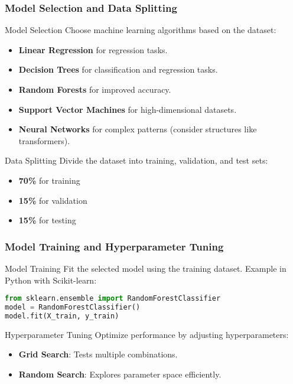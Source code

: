 \documentclass[aspectratio=169]{beamer}
\begin{document}
\begin{frame}[fragile]
    \frametitle{Model Selection and Data Splitting}
    \begin{block}{Model Selection}
        Choose machine learning algorithms based on the dataset:
        \begin{itemize}
            \item \textbf{Linear Regression} for regression tasks.
            \item \textbf{Decision Trees} for classification and regression tasks.
            \item \textbf{Random Forests} for improved accuracy.
            \item \textbf{Support Vector Machines} for high-dimensional datasets.
            \item \textbf{Neural Networks} for complex patterns (consider structures like transformers).
        \end{itemize}
    \end{block}
    
    \begin{block}{Data Splitting}
        Divide the dataset into training, validation, and test sets:
        \begin{itemize}
            \item \textbf{70\%} for training
            \item \textbf{15\%} for validation
            \item \textbf{15\%} for testing
        \end{itemize}
    \end{block}
\end{frame}

\begin{frame}[fragile]
    \frametitle{Model Training and Hyperparameter Tuning}
    \begin{block}{Model Training}
        Fit the selected model using the training dataset. Example in Python with Scikit-learn:
        \begin{lstlisting}[language=Python]
from sklearn.ensemble import RandomForestClassifier
model = RandomForestClassifier()
model.fit(X_train, y_train)
        \end{lstlisting}
    \end{block}
    
    \begin{block}{Hyperparameter Tuning}
        Optimize performance by adjusting hyperparameters:
        \begin{itemize}
            \item \textbf{Grid Search}: Tests multiple combinations.
            \item \textbf{Random Search}: Explores parameter space efficiently.
        \end{itemize}
    \end{block}
\end{frame}
\end{document}
